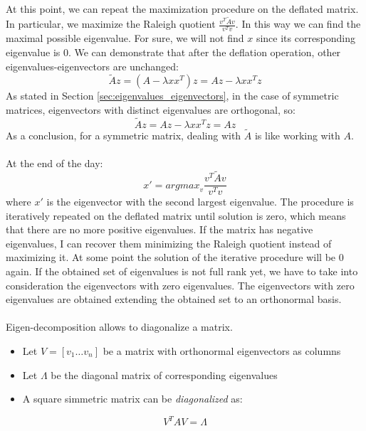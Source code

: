 \paragraph{}
At this point, we can repeat the maximization procedure on the deflated matrix.
In particular, we maximize the Raleigh quotient $\frac{v^{T}\tilde{A}v}{v^{T}v}$.
In this way we can find the maximal possible eigenvalue. For sure, we will not
find $x$ since its corresponding eigenvalue is 0. We can demonstrate that after
the deflation operation, other eigenvalues-eigenvectors are unchanged:
\begin{equation*}
	\tilde{A}z = (A - \lambda x x^{T}) z = Az - \lambda x x^{T}z
\end{equation*}
As stated in Section \ref{sec:eigenvalues_eigenvectors}, in the case of symmetric
matrices, eigenvectors with distinct eigenvalues are orthogonal, so:
\begin{equation*}
	\tilde{A}z = Az - \lambda x x^{T}z = Az
\end{equation*}
As a conclusion, for a symmetric matrix, dealing with $\tilde{A}$ is like
working with $A$.

\paragraph{}
At the end of the day:
\begin{equation*}
	x' = \textit{argmax}_{v}\frac{v^{T}\tilde{A}v}{v^{T}v}
\end{equation*}
where $x'$ is the eigenvector with the second largest eigenvalue. The procedure is
iteratively repeated on the deflated matrix until solution is zero, which means
that there are no more positive eigenvalues. If the matrix has negative eigenvalues,
I can recover them minimizing the Raleigh quotient instead of maximizing it. At some
point the solution of the iterative procedure will be 0 again. If the obtained
set of eigenvalues is not full rank yet, we have to take into consideration the eigenvectors
with zero eigenvalues. The eigenvectors with zero eigenvalues are obtained
extending the obtained set to an orthonormal basis.

\paragraph{}
Eigen-decomposition allows to diagonalize a matrix.

\begin{itemize}
	\item Let $V = [v_{1}\hdots v_{n}]$ be a matrix with orthonormal eigenvectors as
		columns

	\item Let $\Lambda$ be the diagonal matrix of corresponding eigenvalues

	\item A square simmetric matrix can be \textit{diagonalized} as:
\end{itemize}
\begin{equation}
	V^{T}A V = \Lambda
\end{equation}

